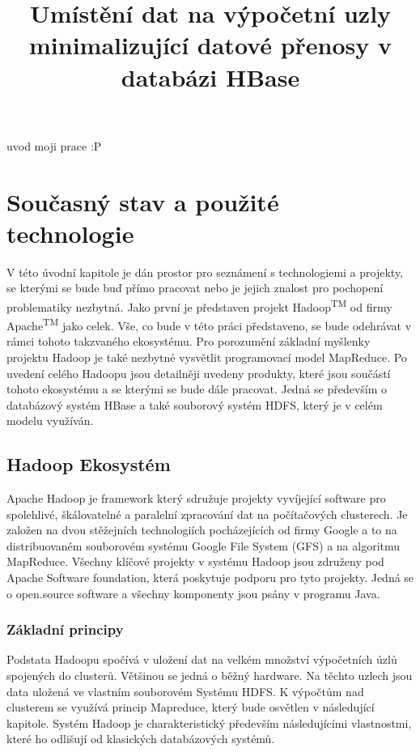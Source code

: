 \documentclass[thesis=M,czech]{FITthesis}[2012/06/26]
\title{Umístění dat na výpočetní uzly minimalizující datové přenosy v databázi HBase}
\begin{document}
\lstset{language=sh}  

\begin{introduction}
	uvod moji prace :P
\end{introduction}

\chapter{Současný stav a použité technologie}
V této úvodní kapitole je dán prostor pro seznámení s technologiemi a projekty, se kterými se bude buď přímo pracovat nebo je jejich znalost pro pochopení problematiky nezbytná. Jako první je představen projekt Hadoop\textsuperscript{TM} od firmy Apache\textsuperscript{TM} jako celek. Vše, co bude v této práci představeno, se bude odehrávat v rámci tohoto takzvaného ekosystému. Pro porozumění základní myšlenky projektu Hadoop je také nezbytné vysvětlit programovací model MapReduce. Po uvedení celého Hadoopu jsou detailněji uvedeny produkty, které jsou součástí tohoto ekosystému a se kterými se bude dále pracovat. Jedná se především o databázový systém HBase a také souborový systém HDFS, který je v celém modelu využíván. 


\section{Hadoop Ekosystém}
Apache Hadoop je framework který sdružuje projekty  vyvíjející software pro spolehlivé, škálovatelné a paralelní zpracování dat na počítačových clusterech. Je založen na dvou stěžejních  technologiích pocházejících od firmy Google  a to na distribuovaném souborovém systému Google File System (GFS) a na algoritmu MapReduce\cite{HadoopDum}. Všechny klíčové projekty v systému Hadoop jsou združeny  pod Apache Software foundation, která poskytuje podporu pro tyto projekty. Jedná se o open.source software a všechny komponenty jsou psány v programu Java.

\subsection{Základní principy}
Podstata Hadoopu spočívá v uložení dat na velkém množství výpočetních úzlů spojených do clusterů. Většinou se jedná o běžný hardware. Na těchto uzlech jsou data uložená ve vlastním souborovém Systému HDFS. K výpočtům nad clusterem se využívá princip Mapreduce, který bude osvětlen v následující kapitole. Systém Hadoop je charakteristický především následujícími vlastnostmi, které ho odlišují od klasických databázových systémů.
\end{document}
